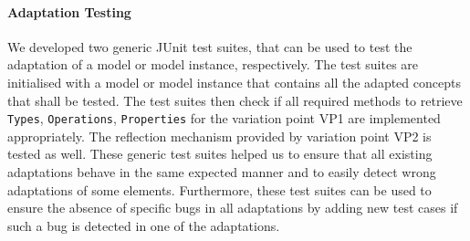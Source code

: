 	\paragraph{Adaptation Testing}
	We developed two generic JUnit test suites, 
	that can be used to test the adaptation of a model 
	or model instance, respectively. 
	The test suites are initialised with a model or model instance that
	contains all the adapted concepts that shall be tested.
	The test suites then check if all required methods to 
	retrieve \texttt{Types}, \texttt{Operations}, \texttt{Properties} for the variation point VP1 are implemented appropriately.
	The reflection mechanism provided by variation point VP2 is tested as well.
	These generic test suites helped us to ensure 
	that all existing adaptations behave in the same expected manner
	and to easily detect wrong adaptations of some elements.
	Furthermore, these test suites can be used to ensure the absence of specific
	bugs in all adaptations by adding new test cases if such a bug is detected in one of the adaptations.